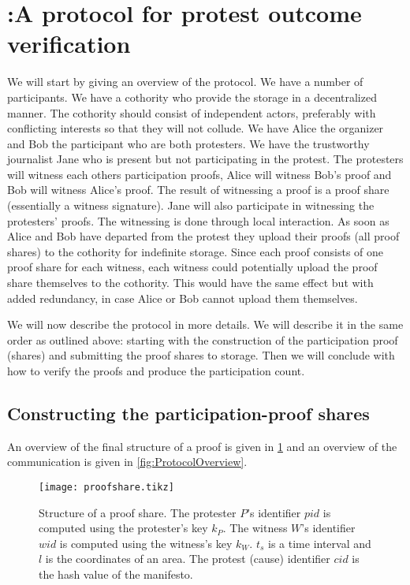 \section{\PRIVO:\@ A protocol for protest outcome verification}%
\label{protocol}

We will start by giving an overview of the protocol.
We have a number of participants.
We have a cothority who provide the storage in a decentralized manner.
The cothority should consist of independent actors, preferably with conflicting 
interests so that they will not collude.
We have Alice the organizer and Bob the participant who are both protesters.
We have the trustworthy journalist Jane who is present but not participating in 
the protest.
The protesters will witness each others participation proofs, \eg Alice will 
witness Bob's proof and Bob will witness Alice's proof.
The result of witnessing a proof is a proof share (essentially a witness 
signature).
Jane will also participate in witnessing the protesters' proofs.
The witnessing is done through local interaction.
As soon as Alice and Bob have departed from the protest they upload their proofs 
(\ie all proof shares) to the cothority for indefinite storage.
Since each proof consists of one proof share for each witness, each witness 
could potentially upload the proof share themselves to the cothority.
This would have the same effect but with added redundancy, in case Alice or Bob 
cannot upload them themselves.

We will now describe the protocol in more details.
We will describe it in the same order as outlined above:
starting with the construction of the participation proof (shares) and 
submitting the proof shares to storage.
Then we will conclude with how to verify the proofs and produce the 
participation count.

\subsection{Constructing the participation-proof shares}

An overview of the final structure of a proof is given in \cref{fig:ProofFig} 
and an overview of the communication is given in \cref{fig:ProtocolOverview}.

\begin{figure}
  \centering
  \texttt{[image: proofshare.tikz]}
  \caption{%
    Structure of a proof share.
    The protester \(P\)'s identifier \(pid\) is computed using the protester's 
    key \(k_P\).
    The witness \(W\)'s identifier \(wid\) is computed using the witness's key 
    \(k_W\).
    \(t_s\) is a time interval and \(l\) is the coordinates of an area.
    The protest (cause) identifier \(cid\) is the hash value of the manifesto.
  }%
  \label{fig:ProofFig}
\end{figure}%

